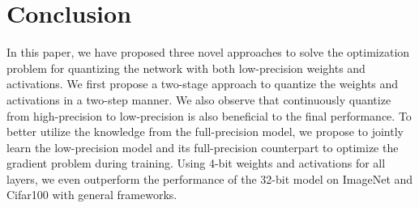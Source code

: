 \section{Conclusion}
In this paper, we have proposed three novel approaches to solve the optimization problem for quantizing the network with both low-precision weights and activations. We first propose a two-stage approach to quantize the weights and activations in a two-step manner. We also observe that continuously quantize from high-precision to low-precision is also beneficial to the final performance. To better utilize the knowledge from the full-precision model, we propose to jointly learn the low-precision model and its full-precision counterpart to optimize the gradient problem during training. Using 4-bit weights and activations for all layers, we even outperform the performance of the 32-bit model on ImageNet and Cifar100 with general frameworks. 